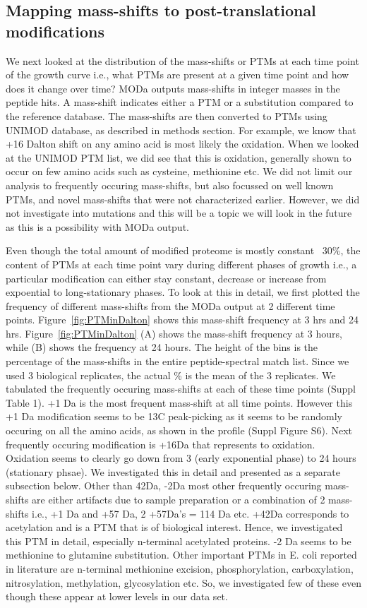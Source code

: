 \documentclass[12pt]{article}
\begin{document}
\subsection{Mapping mass-shifts to post-translational modifications}

We next looked at the distribution of the mass-shifts or PTMs at each time point of the growth curve i.e., what PTMs are present at a given time point and how does it change over time? MODa outputs mass-shifts in integer masses in the peptide hits. A mass-shift indicates either a PTM or a substitution compared to the reference database. The mass-shifts are then converted to PTMs using UNIMOD database, as described in methods section. For example, we know that +16 Dalton shift on any amino acid is most likely the oxidation. When we looked at the UNIMOD PTM list, we did see that this is oxidation, generally shown to occur on few amino acids such as cysteine, methionine etc. We did not limit our analysis to frequently occuring mass-shifts, but also focussed on well known PTMs, and novel mass-shifts that were not characterized earlier. However, we did not investigate into mutations and this will be a topic we will look in the future as this is a possibility with MODa output.

Even though the total amount of modified proteome is mostly constant ~30\%, the content of PTMs at each time point vary during different phases of growth i.e., a particular modification can either stay constant, decrease or increase from expoential to long-stationary phases. To look at this in detail, we first plotted the frequency of different mass-shifts from the MODa output at 2 different time points. Figure~\ref{fig:PTMinDalton} shows this mass-shift frequency at 3 hrs and 24 hrs. Figure~\ref{fig:PTMinDalton} (A) shows the mass-shift frequency at 3 hours, while (B) shows the frequency at 24 hours. The height of the bins is the percentage of the mass-shifts in the entire peptide-spectral match list. Since we used 3 biological replicates, the actual \% is the mean of the 3 replicates. We tabulated the frequently occuring mass-shifts at each of these time points (Suppl Table 1). +1 Da is the most frequent mass-shift at all time points. However this +1 Da modification seems to be 13C peak-picking as it seems to be randomly occuring on all the amino acids, as shown in the profile (Suppl Figure S6). Next frequently occuring modification is +16Da that represents to oxidation. Oxidation seems to clearly go down from 3 (early exponential phase) to 24 hours (stationary phsae). We investigated this in detail and presented as a separate subsection below. Other than 42Da, -2Da most other frequently occuring mass-shifts are either artifacts due to sample preparation or a combination of 2 mass-shifts i.e., +1 Da and +57 Da, 2 +57Da's = 114 Da etc. +42Da corresponds to acetylation and is a PTM that is of biological interest. Hence, we investigated this PTM in detail, especially n-terminal acetylated proteins. -2 Da seems to be methionine to glutamine substitution. Other important PTMs in E. coli reported in literature are n-terminal methionine excision, phosphorylation, carboxylation, nitrosylation, methylation, glycosylation etc. So, we investigated few of these even though these appear at lower levels in our data set.
\end{document}
